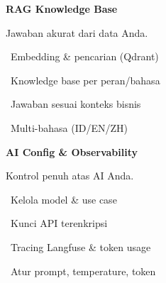 \documentclass[a4paper]{article}
\begin{document}
\noindent
\begin{minipage}[t]{0.485\textwidth}
    \colorbox{OrangePrimary}{%
        \begin{minipage}{\dimexpr\textwidth-2\fboxsep\relax}
            {\fontsize{10}{13}\selectfont\bfseries\color{White} RAG Knowledge Base}
        \end{minipage}}\par
    \vspace{4pt}
    {\fontsize{9}{12}\selectfont\color{TextDark}%
    Jawaban akurat dari data Anda.\par\vspace{3pt}
    \textbullet\ Embedding \& pencarian (Qdrant)\par\vspace{2pt}%
    \textbullet\ Knowledge base per peran/bahasa\par\vspace{2pt}%
    \textbullet\ Jawaban sesuai konteks bisnis\par\vspace{2pt}%
    \textbullet\ Multi-bahasa (ID/EN/ZH)}%

\end{minipage}%
\hfill
\begin{minipage}[t]{0.485\textwidth}
    \colorbox{EmeraldDark}{%
        \begin{minipage}{\dimexpr\textwidth-2\fboxsep\relax}
            {\fontsize{10}{13}\selectfont\bfseries\color{White} AI Config \& Observability}
        \end{minipage}}\par
    \vspace{4pt}
    {\fontsize{9}{12}\selectfont\color{TextDark}%
    Kontrol penuh atas AI Anda.\par\vspace{3pt}
    \textbullet\ Kelola model \& use case\par\vspace{2pt}%
    \textbullet\ Kunci API terenkripsi\par\vspace{2pt}%
    \textbullet\ Tracing Langfuse \& token usage\par\vspace{2pt}%
    \textbullet\ Atur prompt, temperature, token}%

\end{minipage}

\vspace{8pt}
\end{document}
